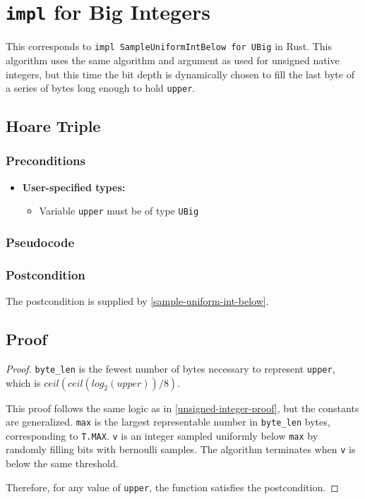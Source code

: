 \documentclass{article}
\begin{document}
\section{\texttt{impl} for Big Integers}
This corresponds to \texttt{impl SampleUniformIntBelow for UBig} in Rust.
This algorithm uses the same algorithm and argument as used for unsigned native integers, 
but this time the bit depth is dynamically chosen to fill the last byte of a series of bytes long enough to hold \texttt{upper}.

\subsection{Hoare Triple}
\subsubsection*{Preconditions}
\begin{itemize}
    \item \textbf{User-specified types:}
    \begin{itemize}
        \item Variable \texttt{upper} must be of type \texttt{UBig}
    \end{itemize}
\end{itemize}

\subsubsection*{Pseudocode}



\subsubsection*{Postcondition}
The postcondition is supplied by \ref{sample-uniform-int-below}.

\subsection{Proof}
\begin{proof} 

\texttt{byte\_len} is the fewest number of bytes necessary to represent \texttt{upper}, 
which is $ceil(ceil(log_2(upper)) / 8)$.

This proof follows the same logic as in \ref{unsigned-integer-proof},
but the constants are generalized.
\texttt{max} is the largest representable number in \texttt{byte\_len} bytes, corresponding to \texttt{T.MAX}.
\texttt{v} is an integer sampled uniformly below \texttt{max} by randomly filling bits with bernoulli samples.
The algorithm terminates when \texttt{v} is below the same threshold.

\noindent Therefore, for any value of \texttt{upper}, the function satisfies the postcondition.
\end{proof}
\end{document}
